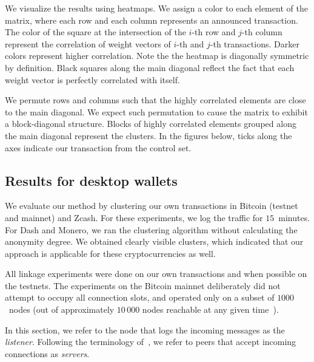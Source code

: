 We visualize the results using heatmaps.
We assign a color to each element of the matrix, where each row and each column represents an announced transaction.
The color of the square at the intersection of the $i$-th row and $j$-th column represent the correlation of weight vectors of $i$-th and $j$-th transactions.
Darker colors represent higher correlation.
Note the the heatmap is diagonally symmetric by definition.
Black squares along the main diagonal reflect the fact that each weight vector is perfectly correlated with itself.

We permute rows and columns such that the highly correlated elements are close to the main diagonal.
We expect such permutation to cause the matrix to exhibit a block-diagonal structure.
Blocks of highly correlated elements grouped along the main diagonal represent the clusters.
In the figures below, ticks along the axes indicate our transaction from the control set.


\subsection{Results for desktop wallets}

We evaluate our method by clustering our own transactions in Bitcoin (testnet and mainnet) and Zcash.
For these experiments, we log the traffic for $15$~minutes.
For Dash and Monero, we ran the clustering algorithm without calculating the anonymity degree.
We obtained clearly visible clusters, which indicated that our approach is applicable for these cryptocurrencies as well.

All linkage experiments were done on our own transactions and when possible on the testnets.
The experiments on the Bitcoin mainnet deliberately did not attempt to occupy all connection slots, and operated only on a subset of $1000$~nodes (out of approximately $10\,000$ nodes reachable at any given time~\cite{Bitnodes}).

In this section, we refer to the node that logs the incoming messages as the \textit{listener}.
Following the terminology of~\cite{Biryukov2014}, we refer to peers that accept incoming connections as \textit{servers}.

